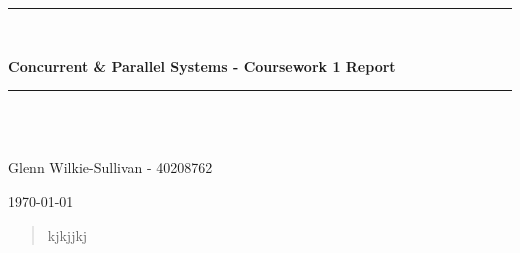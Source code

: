 \documentclass[12pt,a4paper]{article}
\newcommand{\HRule}{\rule{\linewidth}{0.5mm}}
\begin{document}
\begin{center}

\HRule \\[0.4cm]
{\Large \bfseries Concurrent \& Parallel Systems - Coursework 1 Report\par}
\vspace{0.2cm}
\HRule \\[1.5cm]
	
\vspace{3cm}
\begin{minipage}{0.6\textwidth}
\begin{center} \large
\emph{}\\
Glenn Wilkie-Sullivan - 40208762
				
\end{center}
\end{minipage}

\vfill
	
\vspace{1cm}
{\large \today}
\end{center}

\pagebreak
\begin{abstract}
kjkjjkj
\end{abstract}
\end{document}
